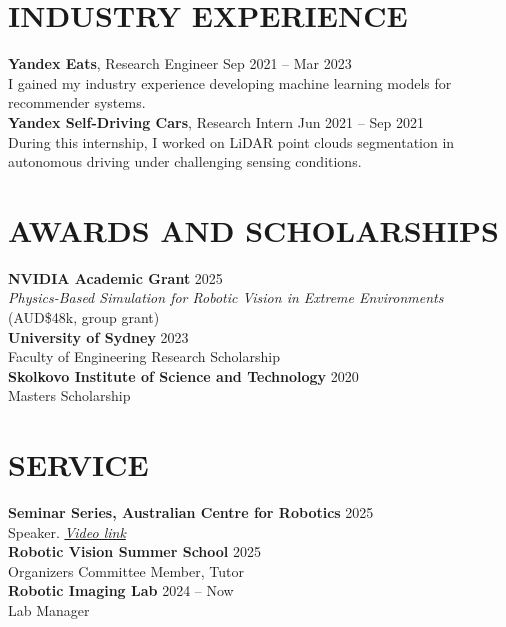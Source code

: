 \documentclass[11pt,a4paper]{article}
\begin{document}
\section*{INDUSTRY EXPERIENCE}

\textbf{Yandex Eats}, Research Engineer \hfill Sep 2021 -- Mar 2023 \\
I gained my industry experience developing machine learning models for recommender systems.\\

\textbf{Yandex Self-Driving Cars}, Research Intern \hfill Jun 2021 -- Sep 2021 \\
During this internship, I worked on LiDAR point clouds segmentation in autonomous driving under challenging sensing conditions.

\section*{AWARDS AND SCHOLARSHIPS}

\textbf{NVIDIA Academic Grant} \hfill 2025 \\
\textit{Physics-Based Simulation for Robotic Vision in Extreme Environments} (AUD\$48k, group grant)\\
    
\textbf{University of Sydney} \hfill 2023\\
Faculty of Engineering Research Scholarship\\

\textbf{Skolkovo Institute of Science and Technology} \hfill  2020\\
Masters Scholarship 

\section*{SERVICE}
\textbf{Seminar Series, Australian Centre for Robotics} \hfill 2025\\
Speaker. \href{https://www.youtube.com/watch?v=o2jRxbg__m8}{\textit{Video link}}\\
    
\textbf{Robotic Vision Summer School} \hfill 2025\\
Organizers Committee Member, Tutor \\ 
    
\textbf{Robotic Imaging Lab} \hfill 2024 -- Now\\
Lab Manager \\
    
\end{document}
